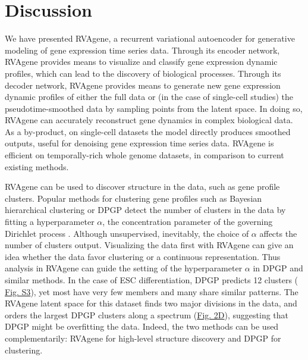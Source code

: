 %


\section{Discussion}
{We have presented RVAgene, a recurrent variational autoencoder for generative modeling of gene expression time series data.
Through its encoder network, RVAgene provides means to visualize and classify gene expression dynamic profiles, which can lead to the discovery of biological processes.
Through its decoder network, RVAgene provides means to generate new gene expression dynamic profiles of either the full data or (in the case of single-cell studies) the pseudotime-smoothed data by sampling points from the latent space. In doing so, RVAgene can accurately reconstruct gene dynamics in complex biological data. As a by-product, on single-cell datasets the model directly produces smoothed outputs, useful for denoising gene expression time series data. RVAgene is efficient on temporally-rich whole genome datasets, in comparison to current existing methods. }
\par
RVAgene can be used to discover structure in the data, such as gene profile clusters. Popular methods for clustering gene profiles such as Bayesian hierarchical clustering \citep{cooke2011bayesian} or DPGP \citep{McDowell2018} detect the number of clusters in the data by fitting a hyperparameter $\alpha$, the concentration parameter of the governing Dirichlet process \citep{ferguson1973bayesian}. Although unsupervised, inevitably, the choice of $\alpha$ affects the number of clusters output. Visualizing the data first with RVAgene can give an idea whether the data favor clustering or a continuous representation. Thus analysis in RVAgene can guide the setting of the hyperparameter $\alpha$ in DPGP and similar methods. In the case of ESC differentiation, DPGP predicts 12 clusters (\hyperref[supp]{ Fig. S3}), yet most have very few members and many share similar patterns. The RVAgene latent space for this dataset finds two major divisions in the data, and orders the largest DPGP clusters along a spectrum (\hyperref[fig:fig3]{Fig. 2D}), suggesting that DPGP might be overfitting the data. Indeed, the two methods can be used complementarily: RVAgene for high-level structure discovery and DPGP for clustering.
